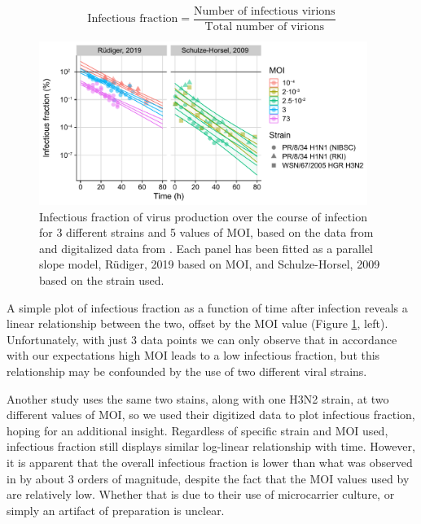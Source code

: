 \begin{equation}
    \text{Infectious fraction} = \frac{\text{Number of infectious virions}}{\text{Total number of virions}}
\end{equation}

\begin{figure}
\begin{center}
\includegraphics[width=0.95\textwidth, trim={0cm 0cm 0cm 0cm}, clip]{D_chapters/3_DARPinModels/InfectiousFractionAll.pdf}
\caption[Infectious fraction of virus production over the course of infection]%
{Infectious fraction of virus production over the course of infection for 3 different strains and 5 values of MOI, based on the data from \cite{frensing2016influenza, rudiger2019multiscale} and digitalized data from \cite{schulze2009infection}. Each panel has been fitted as a parallel slope model, R\"udiger, 2019 based on MOI, and Schulze-Horsel, 2009 based on the strain used.}
\label{figure:infectiousFraction}
\end{center}
\end{figure}

A simple plot of infectious fraction \cite{rudiger2019multiscale, frensing2016influenza} as a function of time after infection reveals a linear relationship between the two, offset by the MOI value (Figure \ref{figure:infectiousFraction}, left). Unfortunately, with just 3 data points we can only observe that in accordance with our expectations high MOI leads to a low infectious fraction, but this relationship may be confounded by the use of two different viral strains.

Another study \cite{schulze2009infection} uses the same two stains, along with one H3N2 strain, at two different values of MOI, so we used their digitized data to plot infectious fraction, hoping for an additional insight. Regardless of specific strain and MOI used, infectious fraction still displays similar log-linear relationship with time. However, it is apparent that the overall infectious fraction is lower than what was observed in \cite{rudiger2019multiscale, frensing2016influenza} by about 3 orders of magnitude, despite the fact that the MOI values used by \cite{schulze2009infection} are relatively low. Whether that is due to their use of microcarrier culture, or simply an artifact of preparation is unclear.

